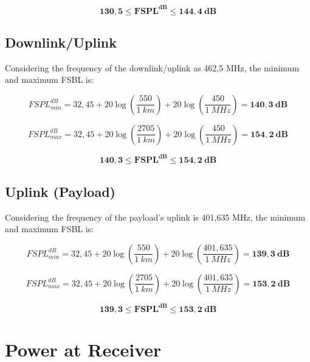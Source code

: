 \begin{equation}
    \mathbf{130,5 \leq FSPL^{dB} \leq 144,4\ dB}
\end{equation}

\subsection{Downlink/Uplink}

Considering the frequency of the downlink/uplink as 462,5 MHz, the minimum and maximum FSBL is:

\begin{equation}
    FSPL^{dB}_{min} = 32,45 + 20\log\left(\frac{550}{1\ km}\right) + 20\log\left(\frac{450}{1\ MHz}\right) = \mathbf{140,3\ dB}
\end{equation}

\begin{equation}
    FSPL^{dB}_{max} = 32,45 + 20\log\left(\frac{2705}{1\ km}\right) + 20\log\left(\frac{450}{1\ MHz}\right) = \mathbf{154,2\ dB}
\end{equation}

\begin{equation}
    \mathbf{140,3 \leq FSPL^{dB} \leq 154,2\ dB}
\end{equation}

\subsection{Uplink (Payload)}

Considering the frequency of the payload's uplink is 401,635 MHz, the minimum and maximum FSBL is:

\begin{equation}
    FSPL^{dB}_{min} = 32,45 + 20\log\left(\frac{550}{1\ km}\right) + 20\log\left(\frac{401,635}{1\ MHz}\right) = \mathbf{139,3\ dB}
\end{equation}

\begin{equation}
    FSPL^{dB}_{max} = 32,45 + 20\log\left(\frac{2705}{1\ km}\right) + 20\log\left(\frac{401,635}{1\ MHz}\right) = \mathbf{153,2\ dB}
\end{equation}

\begin{equation}
    \mathbf{139,3 \leq FSPL^{dB} \leq 153,2\ dB}
\end{equation}

\section{Power at Receiver}

